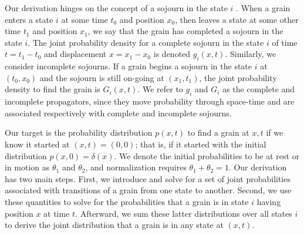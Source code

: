 \documentclass[]{agujournal2018}
\begin{document}
Our derivation hinges on the concept of a sojourn in the state $i$ \citep{Weiss1994}.
When a grain enters a state $i$ at some time $t_0$ and position $x_0$, then leaves a state at some other time $t_1$ and position $x_1$, we say that the grain has completed a sojourn in the state $i$. The joint probability density for a complete sojourn in the state $i$ of time $t = t_1-t_0$ and displacement $x = x_1-x_0$ is denoted $g_i(x,t).$ 
Similarly, we consider incomplete sojourns. If a grain begins a sojourn in the state $i$ at $(t_0,x_0)$ and the sojourn is still on-going at $(x_1,t_1)$, the joint probability density to find the grain is $G_i(x,t)$.
We refer to $g_i$ and $G_i$ as the complete and incomplete propagators, since they move probability through space-time and are associated respectively with complete and incomplete sojourns.

Our target is the probability distribution $p(x,t)$ to find a grain at $x,t$ if we know it started at $(x,t)=(0,0)$; that is, if it started with the initial distribution $p(x,0)=\delta(x)$.
We denote the initial probabilities to be at rest or in motion as $\theta_1$ and $\theta_2$, and normalization requires $\theta_1+\theta_2=1$.
Our derivation has two main steps.
First, we introduce and solve for a set of joint probabilities associated with transitions of a grain from one state to another.
Second, we use these quantities to solve for the probabilities that a grain is in state $i$ having position $x$ at time $t$.
Afterward, we sum these latter distributions over all states $i$ to derive the joint distribution that a grain is in any state at $(x,t)$.
\end{document}
